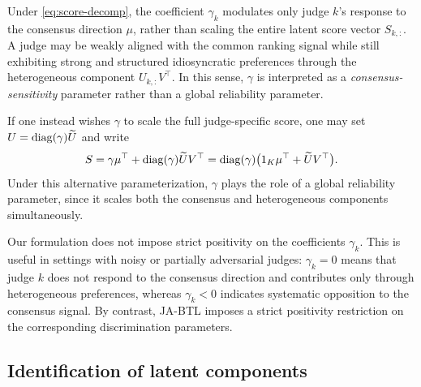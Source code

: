 \documentclass{article}
\begin{document}
\begin{bibunit}[unsrtnat]
\begin{remark}
Under \eqref{eq:score-decomp}, the coefficient $\gamma_k$ modulates only judge $k$'s response to the consensus direction $\mu$, rather than scaling the entire latent score vector $S_{k,:}$. 
A judge may be weakly aligned with the common ranking signal while still exhibiting strong and structured idiosyncratic preferences through the heterogeneous component $U_{k,:}V^\top$. In this sense, $\gamma$ is interpreted as a \emph{consensus-sensitivity} parameter rather than a global reliability parameter.

If one instead wishes $\gamma$ to scale the full judge-specific score, one may set
\(
U={\rm diag}(\gamma)\widetilde U
\)
and write
\[
S
=
\gamma\mu^\top+{\rm diag}(\gamma)\widetilde U V^\top
=
{\rm diag}(\gamma)\bigl(1_K\mu^\top+\widetilde U V^\top\bigr).
\]
Under this alternative parameterization, $\gamma$ plays the role of a global reliability parameter, since it scales both the consensus and heterogeneous components simultaneously.

Our formulation does not impose strict positivity on the coefficients $\gamma_k$. This is useful in settings with noisy or partially adversarial judges: $\gamma_k=0$ means that judge $k$ does not respond to the consensus direction and contributes only through heterogeneous preferences, whereas $\gamma_k<0$ indicates systematic opposition to the consensus signal. By contrast, JA-BTL \citep{xu2026judgeaware} imposes a strict positivity restriction on the corresponding discrimination parameters.
\end{remark}




\subsection{Identification of latent components}
\label{subsec:id}



\end{bibunit}
\end{document}
